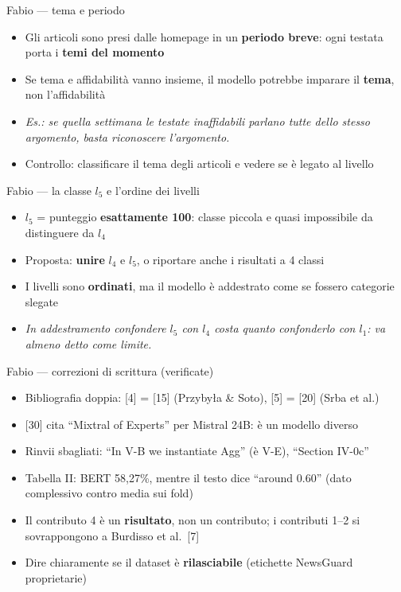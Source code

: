 \documentclass[aspectratio=169]{beamer}
\newcommand{\hl}[1]{\textbf{#1}}
\begin{document}
\begin{frame}{Fabio --- tema e periodo}
  \vfill
  \begin{itemize}[<+->]
    \setlength\itemsep{0.8em}
    \item Gli articoli sono presi dalle homepage in un \hl{periodo breve}: ogni testata porta i \hl{temi del momento}
    \item Se tema e affidabilit\`a vanno insieme, il modello potrebbe imparare il \hl{tema}, non l'affidabilit\`a
    \item[] {\small\itshape Es.: se quella settimana le testate inaffidabili parlano tutte dello stesso argomento, basta riconoscere l'argomento.}
    \item Controllo: classificare il tema degli articoli e vedere se \`e legato al livello
  \end{itemize}
  \vfill
\end{frame}

\begin{frame}{Fabio --- la classe $l_5$ e l'ordine dei livelli}
  \vfill
  \begin{itemize}[<+->]
    \setlength\itemsep{0.8em}
    \item $l_5$ = punteggio \hl{esattamente 100}: classe piccola e quasi impossibile da distinguere da $l_4$
    \item Proposta: \hl{unire} $l_4$ e $l_5$, o riportare anche i risultati a 4 classi
    \item I livelli sono \hl{ordinati}, ma il modello \`e addestrato come se fossero categorie slegate
    \item[] {\small\itshape In addestramento confondere $l_5$ con $l_4$ costa quanto confonderlo con $l_1$: va almeno detto come limite.}
  \end{itemize}
  \vfill
\end{frame}

\begin{frame}{Fabio --- correzioni di scrittura (verificate)}
  \vfill
  \small
  \begin{itemize}[<+->]
    \setlength\itemsep{0.55em}
    \item Bibliografia doppia: [4] = [15] (Przyby\l{}a \& Soto), [5] = [20] (Srba et al.)
    \item {[30]} cita ``Mixtral of Experts'' per Mistral 24B: \`e un modello diverso
    \item Rinvii sbagliati: ``In V-B we instantiate Agg'' (\`e V-E), ``Section IV-0c''
    \item Tabella II: BERT 58,27\%, mentre il testo dice ``around 0.60'' (dato complessivo contro media sui fold)
    \item Il contributo 4 \`e un \hl{risultato}, non un contributo; i contributi 1--2 si sovrappongono a Burdisso et al.\ [7]
    \item Dire chiaramente se il dataset \`e \hl{rilasciabile} (etichette NewsGuard proprietarie)
  \end{itemize}
  \vfill
\end{frame}
\end{document}
